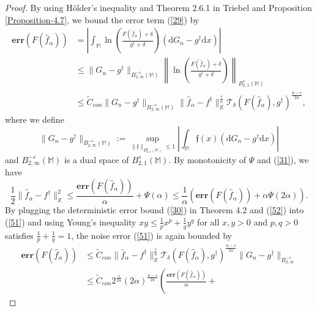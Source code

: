 \documentclass[10pt]{iopart}
\begin{document}
\begin{proof}
By using H\"{o}lder's inequality and Theorem 2.6.1 in Triebel \cite{Triebel1978} and Proposition \ref{Proposition-4.7}, 
we bound the error term (\ref{29}) by
\begin{align}\label{51}
\mathbf{err}(F(\widehat{f}_{\alpha}))&=\left|\int_{\mathbb{M}}\ln\left(\frac{F(\widehat{f}_{\alpha})+\delta}{g^{\dagger}+\delta}\right)
\left(\mathrm{d}G_{n}-g^{\dagger}\mathrm{d}x\right)\right|\nonumber\\
&\leq \|G_{n}-g^{\dagger}\|_{B_{2, \infty}^{-s}(\mathbb{M})}\left\|\ln\left(\frac{F(\widehat{f}_{\alpha})+\delta}
{g^{\dagger}+\delta}\right)\right\|_{B_{2,1}^{s}(\mathbb{M})}\nonumber\\
&\leq \widetilde{C}_{con}\|G_{n}-g^{\dagger}\|_{B_{2, \infty}^{-s}(\mathbb{M})}
\|\widehat{f}_{\alpha}-f^{\dagger}\|_{\mathbb{X}}^{\frac{s}{u}}
\mathcal{T}_{\delta}(F(\widehat{f}_{\alpha}), g^{\dagger})^{\frac{u-s}{2u}},
\end{align}
where we define
\begin{equation*}
\|G_{n}-g^{\dagger}\|_{B_{2, \infty}^{-s}(\mathbb{M})}:=\sup_{\|\mathfrak{f}\|_{B_{2,1}^{s}(\mathbb{M})}\leq 1}
\left|\int_{\mathbb{M}}\mathfrak{f}(x)(\mathrm{d}G_{n}-g^{\dagger}\mathrm{d}x)\right|
\end{equation*}
and $B_{2,\infty}^{-s}(\mathbb{M})$ is a dual space of $B_{2,1}^{s}(\mathbb{M})$. By monotonicity of $\Psi$ and (\ref{31}), we have
\begin{equation}\label{52}
\frac{1}{2}\|\widehat{f}_{\alpha}-f^{\dagger}\|_{\mathbb{X}}^{2}\leq \frac{\mathbf{err}(F(\widehat{f}_{\alpha}))}
{\alpha}+\Psi(\alpha)\leq \frac{1}{\alpha}\left(\mathbf{err}(F(\widehat{f}_{\alpha}))+\alpha\Psi(2\alpha)\right).
\end{equation}
By plugging the deterministic error bound (\ref{30}) in Theorem 4.2 and (\ref{52}) into (\ref{51}) and using Young's inequality 
$xy\leq \frac{1}{p}x^{p}+\frac{1}{q}y^{q}$ for all $x, y>0$ and $p, q>0$ satisfies $\frac{1}{p}+\frac{1}{q}=1$, 
the noise error (\ref{51}) is again bounded by
\allowdisplaybreaks
\begin{align}\label{53}
\mathbf{err}(F(\widehat{f}_{\alpha}))&\leq\widetilde{C}_{con}\|\widehat{f}_{\alpha}-f^{\dagger}\|_{\mathbb{X}}^{\frac{s}{u}}
\mathcal{T}_{\delta}(F(\widehat{f}_{\alpha}), g^{\dagger})^{\frac{u-s}{2u}}\|G_{n}-g^{\dagger}\|_{B_{2, \infty}^{-s}}\nonumber\\
&\leq\widetilde{C}_{con}2^{\frac{s}{2u}}(2\alpha)^{\frac{u-s}{2u}}\left(\frac{\mathbf{err}(F(\widehat{f}_{\alpha}))}{\alpha}+

\end{align}
\end{proof}
\end{document}
